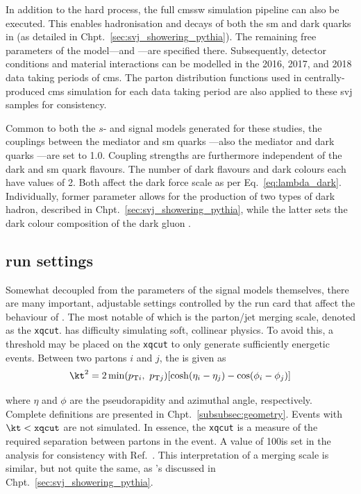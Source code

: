 In addition to the hard process, the full \acrshort{cmssw} simulation pipeline can also be executed. This enables hadronisation and decays of both the \acrshort{sm} and dark quarks in \PYTHIA (as detailed in Chpt.~\ref{sec:svj_showering_pythia}). The remaining free parameters of the model---\aDark and \rinv---are specified there. Subsequently, detector conditions and material interactions can be modelled in the 2016, 2017, and 2018 data taking periods of \acrshort{cms}. The parton distribution functions used in centrally-produced \acrshort{cms} simulation for each data taking period are also applied to these \gls{svj} samples for consistency.

Common to both the $s$- and \tchannel signal models generated for these studies, the couplings between the mediator and \acrshort{sm} quarks \gq---also the mediator and dark quarks \gqdark---are set to 1.0. Coupling strengths are furthermore independent of the dark and \acrshort{sm} quark flavours. The number of dark flavours \Nf and dark colours \Nc each have values of 2. Both affect the dark force scale as per Eq.~\ref{eq:lambda_dark}. Individually, former parameter allows for the production of two types of dark hadron, described in Chpt.~\ref{sec:svj_showering_pythia}, while the latter sets the dark colour composition of the dark gluon \Pgdark. 




\subsection{\texorpdfstring{\MADGRAPH}{MadGraph} run settings}
\label{subsec:svj_mg_run_settings}

Somewhat decoupled from the parameters of the signal models themselves, there are many important, adjustable settings controlled by the run card that affect the behaviour of \MADGRAPH. The most notable of which is the parton/\gls{jet} merging scale, denoted as the \texttt{xqcut}. \MADGRAPH has difficulty simulating soft, collinear physics. To avoid this, a threshold may be placed on the \texttt{xqcut} to only generate sufficiently energetic events. Between two partons $i$ and $j$, the \kt is given as
\begin{equation}
    \kt^2 = 2 \min(p_{\mathrm{T}i}, \ p_{\mathrm{T}j}) [\cosh(\eta_i - \eta_j) - \cos(\phi_i - \phi_j)]
    \label{eq:svj_mg_kt}
\end{equation}

where $\eta$ and $\phi$ are the pseudorapidity and azimuthal angle, respectively. Complete definitions are presented in Chpt.~\ref{subsubsec:geometry}. Events with $\kt < \texttt{xqcut}$ are not simulated. In essence, the \texttt{xqcut} is a measure of the required separation between partons in the event. A value of 100\GeV is set in the analysis for consistency with Ref.~. This interpretation of a merging scale is similar, but not quite the same, as \PYTHIA's discussed in Chpt.~\ref{sec:svj_showering_pythia}.

